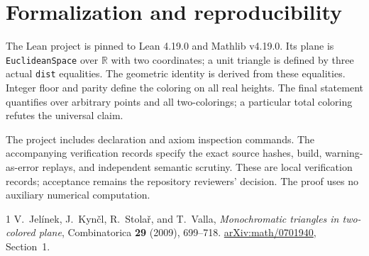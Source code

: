 \documentclass[10pt]{article}
\newcommand{\R}{\mathbb R}
\begin{document}
\section{Formalization and reproducibility}
The Lean project is pinned to Lean 4.19.0 and Mathlib v4.19.0. Its plane is \texttt{EuclideanSpace} over $\R$ with two coordinates; a unit triangle is defined by three actual \texttt{dist} equalities. The geometric identity is derived from these equalities. Integer floor and parity define the coloring on all real heights. The final statement quantifies over arbitrary points and all two-colorings; a particular total coloring refutes the universal claim.

The project includes declaration and axiom inspection commands. The accompanying verification records specify the exact source hashes, build, warning-as-error replays, and independent semantic scrutiny. These are local verification records; acceptance remains the repository reviewers' decision. The proof uses no auxiliary numerical computation.

\begin{thebibliography}{1}
V.~Jel\'inek, J.~Kyn\v{c}l, R.~Stola\v{r}, and T.~Valla,
\emph{Monochromatic triangles in two-colored plane},
Combinatorica \textbf{29} (2009), 699--718.
\href{https://arxiv.org/abs/math/0701940}{arXiv:math/0701940}, Section~1.
\end{thebibliography}
\end{document}

